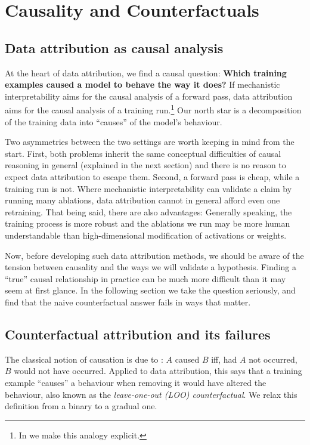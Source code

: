 \section{Causality and Counterfactuals}\label{sec:causality}

\subsection{Data attribution as causal analysis}\label{subsec:da-causal}

At the heart of data attribution, we find a causal question: \textbf{Which training examples caused a model to behave the way it does?}
If mechanistic interpretability aims for the causal analysis of a forward pass, data attribution aims for the causal analysis of a training run.\footnote{In  we make this analogy explicit.} Our north star is a decomposition of the training data into ``causes'' of the model's behaviour.

Two asymmetries between the two settings are worth keeping in mind from the start. First, both problems inherit the same conceptual difficulties of causal reasoning in general (explained in the next section) and there is no reason to expect data attribution to escape them. Second, a forward pass is cheap, while a training run is not. Where mechanistic interpretability can validate a claim by running many ablations, data attribution cannot in general afford even one retraining. That being said, there are also advantages: Generally speaking, the training process is more robust and the ablations we run may be more human understandable than high-dimensional modification of activations or weights.

Now, before developing such data attribution methods, we should be aware of the tension between causality and the ways we will validate a hypothesis. Finding a ``true'' causal relationship in practice can be much more difficult than it may seem at first glance.
In the following section we take the question seriously, and find that the naive counterfactual answer fails in ways that matter.


\subsection{Counterfactual attribution and its failures}\label{subsec:counterfactual}

The classical notion of causation is due to \citet{lewis1973causation}: $A$ caused $B$ iff, had $A$ not occurred, $B$ would not have occurred. Applied to data attribution, this says that a training example ``causes'' a behaviour when removing it would have altered the behaviour, also known as the \emph{leave-one-out (LOO) counterfactual}. We relax this definition from a binary to a gradual one.

